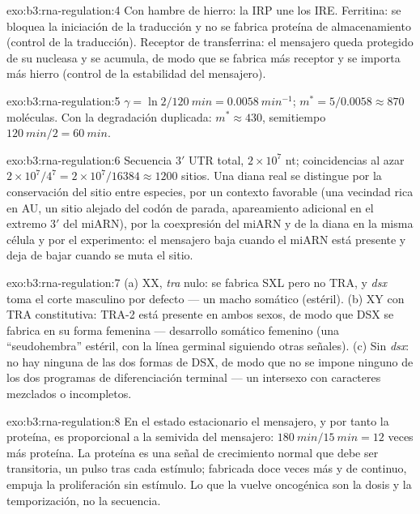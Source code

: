 \begin{solution}{exo:b3:rna-regulation:4}
Con hambre de hierro: la IRP une los IRE. Ferritina: se bloquea la
iniciación de la traducción y no se fabrica proteína de almacenamiento
(control de la traducción). Receptor de transferrina: el mensajero queda
protegido de su nucleasa y se acumula, de modo que se fabrica más
receptor y se importa más hierro (control de la estabilidad del
mensajero).
\end{solution}

\begin{solution}{exo:b3:rna-regulation:5}
$\gamma = \ln 2/\qty{120}{min} = \qty{0.0058}{min^{-1}}$; $m^{*} =
5/0.0058 \approx 870$ moléculas. Con la degradación duplicada:
$m^{*} \approx 430$, semitiempo $\qty{120}{min}/2 = \qty{60}{min}$.
\end{solution}

\begin{solution}{exo:b3:rna-regulation:6}
Secuencia 3$'$ UTR total, $2\times 10^{7}$ nt; coincidencias al azar $2\times
10^{7}/4^{7} = 2\times 10^{7}/\num{16384} \approx \num{1200}$ sitios. Una diana real se distingue por la conservación del sitio entre
especies, por un contexto favorable (una vecindad rica en AU, un sitio
alejado del codón de parada, apareamiento adicional en el extremo 3$'$
del miARN), por la coexpresión del miARN y de la diana en la misma célula
y por el experimento: el mensajero baja cuando el miARN está presente y
deja de bajar cuando se muta el sitio.
\end{solution}

\begin{solution}{exo:b3:rna-regulation:7}
(a) XX, \emph{tra} nulo: se fabrica SXL pero no TRA, y \emph{dsx} toma el
corte masculino por defecto --- un macho somático (estéril). (b) XY con
TRA constitutiva: TRA-2 está presente en ambos sexos, de modo que DSX se
fabrica en su forma femenina --- desarrollo somático femenino (una
``seudohembra'' estéril, con la línea germinal siguiendo otras señales).
(c) Sin \emph{dsx}: no hay ninguna de las dos formas de DSX, de modo que
no se impone ninguno de los dos programas de diferenciación terminal ---
un intersexo con caracteres mezclados o incompletos.
\end{solution}

\begin{solution}{exo:b3:rna-regulation:8}
En el estado estacionario el mensajero, y por tanto la proteína, es
proporcional a la semivida del mensajero:
$\qty{180}{min}/\qty{15}{min} = 12$ veces más proteína. La proteína es
una señal de crecimiento normal que debe ser transitoria, un pulso tras
cada estímulo; fabricada doce veces más y de continuo, empuja la
proliferación sin estímulo. Lo que la vuelve oncogénica son la dosis y la
temporización, no la secuencia.
\end{solution}

